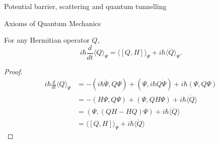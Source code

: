 \documentclass[a4paper]{article}
\theoremstyle{definition}
\begin{document}
Potential barrier, scattering and quantum tunnelling

Axioms of Quantum Mechanics

\begin{thm}
  For any Hermitian operator \(Q\),
  \[
    i\hbar \frac{d}{dt}\langle Q\rangle_\Psi = \langle[Q,H]\rangle_\Psi + i\hbar \langle \dot{Q}\rangle_\Psi.
  \]
  
\end{thm}

\begin{proof}
  \begin{align*}
    i\hbar \frac{d}{dt}\langle Q\rangle_\Psi &= -(i\hbar \dot{\Psi},Q\Psi) + (\Psi, i\hbar Q\dot{\Psi}) + i\hbar(\Psi, Q\Psi)\\
                                             &= -(H\Psi, Q\Psi) + (\Psi, QH\Psi) + i\hbar\langle\dot{Q}\rangle\\
                                             &= (\Psi, (QH-HQ)\Psi) + i\hbar\langle\dot{Q}\rangle\\
                                             &= \langle[Q,H]\rangle_\Psi + i\hbar\langle\dot{Q}\rangle
  \end{align*}
\end{proof}
\end{document}
